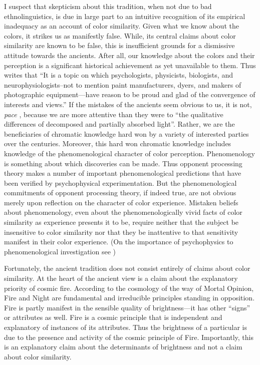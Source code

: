 I suspect that skepticism about this tradition, when not due to bad ethnolinguistics, is due in large part to an intuitive recognition of its empirical inadequacy as an account of color similarity. Given what we know about the colors, it strikes us as manifestly false. While, its central claims about color similarity are known to be false, this is insufficient grounds for a dismissive attitude towards the ancients. After all, our knowledge about the colors and their perception is a significant historical achievement as yet unavailable to them. Thus \citet[291]{Broackes:2010uq} writes that ``It is a topic on which psychologists, physicists, biologists, and neurophysiologists--not to mention paint manufacturers, dyers, and makers of photographic equipment---have reason to be proud and glad of the convergence of interests and views.'' If the mistakes of the ancients seem obvious to us, it is not, \emph{pace} \citet[162]{Platnauer:1921bh}, because we are more attentive than they were to ``the qualitative differences of decomposed and partially absorbed light''. Rather, we are the beneficiaries of chromatic knowledge hard won by a variety of interested parties over the centuries. Moreover, this hard won chromatic knowledge includes knowledge of the phenomenological character of color perception. Phenomenology is something about which discoveries can be made. Thus opponent processing theory makes a number of important phenomenological predictions that have been verified by psychophysical experimentation. But the phenomenological commitments of opponent processing theory, if indeed true, are not obvious merely upon reflection on the character of color experience. Mistaken beliefs about phenomenology, even about the phenomenologically vivid facts of color similarity as experience presents it to be, require neither that the subject be insensitive to color similarity nor that they be inattentive to that sensitivity manifest in their color experience. (On the importance of psychophysics to phenomenological investigation see \citealt{Hilbert:2007qy,Phillips:2012af})

Fortunately, the ancient tradition does not consist entirely of claims about color similarity. At the heart of the ancient view is a claim about the explanatory priority of cosmic fire. According to the cosmology of the way of Mortal Opinion, Fire and Night are fundamental and irreducible principles standing in opposition. Fire is partly manifest in the sensible quality of brightness---it has other ``signs'' or attributes as well. Fire is a cosmic principle that is independent and explanatory of instances of its attributes. Thus the brightness of a particular is due to the presence and activity of the cosmic principle of Fire. Importantly, this is an explanatory claim about the determinants of brightness and not a claim about color similarity. 

